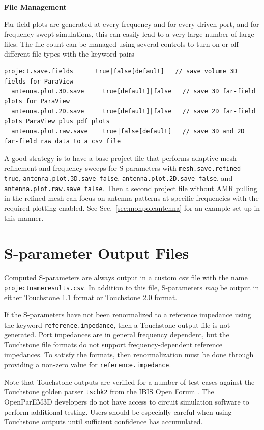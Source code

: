 \documentclass[titlepage]{article}
\renewcommand\_{\textunderscore\linebreak[1]}
\begin{document}
\noindent \textbf{File Management}\newline

Far-field plots are generated at every frequency and for every driven port, and for frequency-swept simulations, this can easily lead to a very large number of large files.  The file count can be managed using several controls to turn on or off different file types with the keyword pairs
\begin{Verbatim}[fontsize=\small]
  project.save.fields      true|false[default]   // save volume 3D fields for ParaView
  antenna.plot.3D.save     true[default]|false   // save 3D far-field plots for ParaView
  antenna.plot.2D.save     true[default]|false   // save 2D far-field plots ParaView plus pdf plots 
  antenna.plot.raw.save    true|false[default]   // save 3D and 2D far-field raw data to a csv file
\end{Verbatim}

A good strategy is to have a base project file that performs adaptive mesh refinement and frequency sweeps for S-parameters with \texttt{mesh.save.refined true}, \texttt{antenna.plot.3D.save false}, \texttt{antenna.plot.2D.save false}, and \texttt{antenna.plot.raw.save false}.  Then a second project file without AMR pulling in the refined mesh can focus on antenna patterns at specific frequencies with the required plotting enabled.  See Sec.~\ref{sec:monpoleantenna} for an example set up in this manner.

\section{S-parameter Output Files}
\label{sec:Soutput}

Computed S-parameters are always output in a custom csv file with the name \texttt{projectname\_results.csv}.  In addition to this file, S-parameters \textit{may} be output in either Touchstone 1.1 format or Touchstone 2.0 format.

If the S-parameters have not been renormalized to a reference impedance using the keyword \newline\texttt{reference.impedance}, then a Touchstone output file is not generated.  Port impedances are in general frequency dependent, but the Touchstone file formats do not support frequency-dependent reference impedances.  To satisfy the formats, then renormalization must be done through providing a non-zero value for \texttt{reference.impedance}.

Note that Touchstone outputs are verified for a number of test cases against the Touchstone golden parser \texttt{tschk2} from the IBIS Open Forum \cite{IBIS}. The OpenParEM3D developers do not have access to circuit simulation software to perform additional testing.  Users should be especially careful when using Touchstone outputs until sufficient confidence has accumulated.
\end{document}
